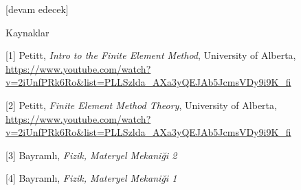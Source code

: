 \documentclass[12pt,fleqn]{article}\usepackage{../../common}
\begin{document}
[devam edecek]

Kaynaklar

[1] Petitt, {\em Intro to the Finite Element Method}, University of Alberta,
    \url{https://www.youtube.com/watch?v=2iUnfPRk6Ro&list=PLLSzlda_AXa3yQEJAb5JcmsVDy9i9K_fi}

[2] Petitt, {\em Finite Element Method Theory}, University of Alberta,
    \url{https://www.youtube.com/watch?v=2iUnfPRk6Ro&list=PLLSzlda_AXa3yQEJAb5JcmsVDy9i9K_fi}

[3] Bayramlı, {\em Fizik, Materyel Mekaniği 2}
    
[4] Bayramlı, {\em Fizik, Materyel Mekaniği 1}
    
\end{document}
